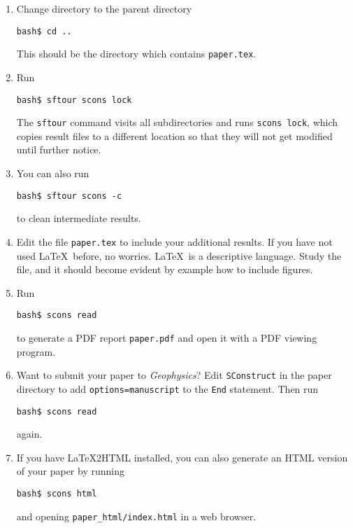 \begin{enumerate}
\item Change directory to the parent directory
\begin{verbatim}
bash$ cd ..
\end{verbatim}
This should be the directory which contains \texttt{paper.tex}.
\item Run
\begin{verbatim}
bash$ sftour scons lock
\end{verbatim}
The \texttt{sftour} command visits all subdirectories and runs \texttt{scons lock}, which copies result files to a different location so that they will not get modified until further notice.
\item You can also run
\begin{verbatim}
bash$ sftour scons -c
\end{verbatim}
to clean intermediate results.
\item Edit the file \texttt{paper.tex} to include your additional results. If you have not used \LaTeX\ before, no worries. \LaTeX\ is a descriptive language. Study the file, and it should become evident by example how to include figures.
\item Run
\begin{verbatim}
bash$ scons read
\end{verbatim}
to generate a PDF report \texttt{paper.pdf} and open it with a PDF viewing program. 
\item Want to submit your paper to \emph{Geophysics}? Edit \texttt{SConstruct} in the 
paper directory to add \texttt{options=manuscript} to the \texttt{End} statement. Then run
\begin{verbatim}
bash$ scons read
\end{verbatim}
again.
\item If you have \LaTeX2HTML installed, you can also generate an HTML version of your paper by running
\begin{verbatim}
bash$ scons html
\end{verbatim}
and opening \verb#paper_html/index.html# in a web browser.
\end{enumerate}





